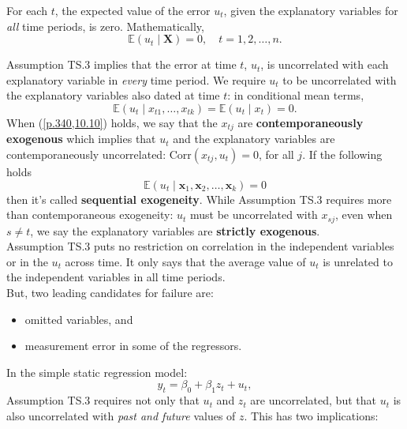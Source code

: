 \documentclass[a4paper, 10pt]{article}
\theoremstyle{definition}	%
\begin{document}
\begin{tcolorbox}[colback=blue!5!white, colframe=blue!80!black, title=Assumption TS.3 -- Zero Conditional Mean]
For each \(t\), the expected value of the error \(u_t\), given the explanatory variables for \textit{all} time periods, is zero. Mathematically,
\begin{equation}
    \mathbb{E}(u_t \mid \mathbf{X}) = 0, \quad t = 1, 2, \ldots, n.
\end{equation}
\end{tcolorbox}
Assumption TS.3 implies that the error at time \( t \), \( u_t \), is uncorrelated with each explanatory variable in \textit{every} time period. We require \( u_t \) to be uncorrelated with the explanatory variables also dated at time \( t \): in conditional mean terms,
\begin{equation}
    \mathbb{E}(u_t \mid x_{t1}, \dots, x_{tk}) = \mathbb{E}(u_t \mid x_t) = 0. \label{p.340,10.10}
\end{equation}
When (\ref{p.340,10.10}) holds, we say that the \( x_{tj} \) are \textbf{contemporaneously exogenous} which implies that \( u_t \) and the explanatory variables are contemporaneously uncorrelated: \( \text{Corr}(x_{tj}, u_t) = 0 \), for all \( j \). If the following holds
\begin{equation*}
    \mathbb{E}(u_t \mid \mathbf{x}_{1}, \mathbf{x}_{2}, \ldots, \mathbf{x}_k) = 0
\end{equation*}
then it's called \textbf{sequential exogeneity}.
While Assumption TS.3 requires more than contemporaneous exogeneity: \( u_t \) must be uncorrelated with \( x_{sj} \), even when \( s \neq t \), we say the explanatory variables are \textbf{strictly exogenous}.\\
Assumption TS.3 puts no restriction on correlation in the independent variables or in the \( u_t \) across time. It only says that the average value of \( u_t \) is unrelated to the independent variables in all time periods.\\
But, two leading candidates for failure are:
\begin{itemize}
    \item omitted variables, and
    \item measurement error in some of the regressors.
\end{itemize}
In the simple static regression model:
\begin{equation*}
    y_t = \beta_0 + \beta_1 z_t + u_t,
\end{equation*}
Assumption TS.3 requires not only that \( u_t \) and \( z_t \) are uncorrelated, but that \( u_t \) is also uncorrelated with \emph{past and future} values of \( z \). This has two implications:
\end{document}
